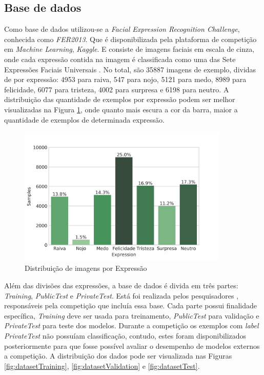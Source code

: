\subsection{Base de dados}
Como base de dados utilizou-se a \emph{Facial Expression Recognition Challenge}, conhecida como \emph{FER2013}. Que é disponibilizada pela plataforma de competição em \emph{Machine Learning}, \emph{Kaggle}. E consiste de imagens faciais em escala de cinza, onde cada expressão contida na imagem é classificada como uma das Sete Expressões Faciais Universais \cite{}. No total, são 35887 imagens de exemplo, dividas de por expressão: 4953 para raiva, 547 para nojo, 5121 para medo, 8989 para felicidade, 6077 para tristeza, 4002 para surpresa e 6198 para neutro. A distribuição das quantidade de exemplos por expressão podem ser melhor visualizadas na Figura \ref{fig:dataset}, onde quanto mais escura a cor da barra, maior a quantidade de exemplos de determinada expressão.

\begin{figure}[!htb]
    \centering
    \includegraphics[width=10cm]{images/expression_distribution.png}
    \caption{Distribuição de imagens por Expressão}
    \label{fig:dataset}
\end{figure}

Além das divisões das expressões, a base de dados é divida em três partes: \emph{Training}, \emph{PublicTest} e \emph{PrivateTest}. Está foi realizada pelos pesquisadores \cite{}, responsáveis pela competição que incluía essa base. Cada parte possui finalidade específica, \emph{Training} deve ser usada para treinamento, \emph{PublicTest} para validação e \emph{PrivateTest} para teste dos modelos. Durante a competição os exemplos com \emph{label} \emph{PrivateTest} não possuíam classificação, contudo, estes foram disponibilizados posteriormente para que fosse possível avaliar o desempenho de modelos externos a competição. A distribuição dos dados pode ser visualizada nas Figuras \ref{fig:datasetTraining}, \ref{fig:datasetValidation} e \ref{fig:datasetTest}.

